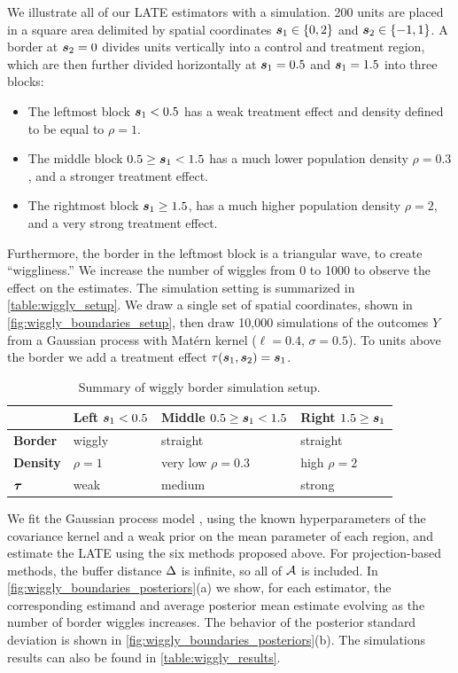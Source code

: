     We illustrate all of our LATE estimators with a simulation.
200 units are placed in a square area delimited by spatial coordinates \(\bm{s}_1 \in \left\lbrace0,2\right\rbrace\) and \(\bm{s}_2 \in \left\lbrace-1, 1\right\rbrace\).
A border at \(\bm{s}_2=0\) divides units vertically into a control and treatment region,
which are then further divided horizontally at \(\bm{s}_1=0.5\) and \(\bm{s}_1=1.5\) into three blocks:
\begin{itemize}
\item
  The leftmost block \(\bm{s}_1 < 0.5\) has a weak treatment effect and density defined to be equal to \(\rho=1\).
\item
  The middle block \(0.5 \ge \bm{s}_1 < 1.5\) has a much lower population density \(\rho=0.3\), and a stronger treatment effect.
\item
  The rightmost block \(\bm{s}_1 \ge 1.5\), has a much higher population density \(\rho=2\), and a very strong treatment effect.
\end{itemize}
Furthermore, the border in the leftmost block is a triangular wave, to create ``wiggliness.''
We increase the number of wiggles from 0 to 1000 to observe the effect on the estimates.
The simulation setting is summarized in \autoref{table:wiggly_setup}.
We draw a single set of spatial coordinates, shown in \autoref{fig:wiggly_boundaries_setup}, then draw 10,000 simulations of the outcomes \(Y\) from a Gaussian process with Mat\'ern kernel (\(\ell=0.4\), \(\sigma=0.5\)).
To units above the border we add a treatment effect \(\tau(\bm{s}_1, \bm{s}_2) = \bm{s}_1\).



\begin{table}[tbp]
\centering
\bgroup
\def\arraystretch{1.1}%
\begin{tabular}{llll}
\hline
& Left \(\bm{s}_1< 0.5\) & Middle \(0.5 \ge \bm{s}_1 < 1.5\) & Right \(1.5 \ge \bm{s}_1\)\tabularnewline
\hline
\textbf{Border} & wiggly & straight & straight\tabularnewline
\textbf{Density} & \(\rho=1\) & very low \(\rho=0.3\) & high \(\rho=2\)\tabularnewline
\(\bm{\tau}\) & weak & medium & strong\tabularnewline
\hline
\end{tabular}
\egroup
\caption{
    Summary of wiggly border simulation setup.
    \label{table:wiggly_setup}}
\end{table}

    We fit the Gaussian process model ,
using the known hyperparameters of the covariance kernel and a weak prior on the mean parameter of each region,
and estimate the LATE using the six methods proposed above.
For projection-based methods, the buffer distance \(\Delta\) is infinite, so all of \(\mathcal{A}\) is included.
In \autoref{fig:wiggly_boundaries_posteriors}(a) we show, for each estimator, the corresponding estimand and average posterior mean estimate evolving as the number of border wiggles increases.
The behavior of the posterior standard deviation is shown in \autoref{fig:wiggly_boundaries_posteriors}(b).
The simulations results can also be found in \autoref{table:wiggly_results}.



